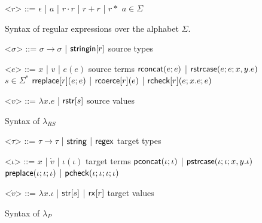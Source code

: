 \documentclass[11pt,leqno]{article}
\theoremstyle{definition}
\newcommand{\lambdap}{\lambda_P}
\newcommand{\sisubst}[3]{{\sf rreplace}[#1](#2;#3)} \newcommand{\rreplace}[3]{{\sf rreplace}[#1](#2;#3)} %
\newcommand{\rcoerce}[2]{{\sf rcoerce}[#1](#2)}
\newcommand{\sistr}[1]{{\sf rstr}[#1]}   \newcommand{\rstr}[1]{{\sf rstr}[#1]} %
\newcommand{\rcheck}[4]{ {\sf rcheck}[#1](#2;#3;#4) }
\newcommand{\strin}[1]{\sistr{#1}}
\newcommand{\rsconcat}[2]{{\sf rconcat}(#1;#2)} \newcommand{\rconcat}[2]{{\sf rconcat}(#1;#2)} %
\newcommand{\stringin}[1]{{\sf stringin}[#1]}
\newcommand{\tcheck}[4]{{\sf pcheck}(#1; #2; #3; #4)}
\renewcommand{\tstr}[1]{{{\sf str}[#1]}}
\newcommand{\preplace}[3]{{\sf preplace}(#1;#2;#3)}
\newcommand{\tconcat}[2]{{\sf pconcat}(#1;#2)} %
\newcommand{\rx}[1]{ {\sf rx}[#1] }
\newcommand{\str}{{\sf string}}
\newcommand{\regex}{{\sf regex}}
\newcommand{\strcase}[3]{ {\sf rstrcase}(#1; #2; #3)}
\newcommand{\pstrcase}[3]{ {\sf pstrcase}(#1; #2; #3)}
\begin{document}









\clearpage
\renewcommand{\grammarlabel}[2]{#1\hfill#2}
\begin{figure}[b]
\small
  \begin{grammar}
<$r$> ::= $\epsilon$ | $a$ | $r \cdot r$ | $r + r$ | $r*$ \hfill $a \in \Sigma$

\caption[Syntax of Regular Expressions]{Syntax of regular expressions over the alphabet $\Sigma$.}
\label{fig:regex}
\end{grammar}
\end{figure}
\begin{figure}[t]
\small
  \begin{grammar}
<$\sigma$> ::=  $\sigma \rightarrow \sigma$ | $\stringin{r}$    \hfill  source types

<$e$> ::= 
      $x$ | $v$ | $e(e)$ \hfill source terms \alt 
      $\rsconcat{e}{e}$ | $\strcase{e}{e}{x,y.e}$ \hfill $s \in \Sigma^{*}$ \alt
      $\sisubst{r}{e}{e}$ | $\rcoerce{r}{e}$ | $\rcheck{r}{e}{x.e}{e}$

<$v$> ::= $\lambda x . e$ | $\strin{s}$ \hfill source values 
\caption{Syntax of $\lambda_{RS}$}
\label{fig:glambdas}
\end{grammar}
\end{figure}


\renewcommand{\grammarlabel}[2]{#1\hfill#2}

\begin{figure}[t]
\small
  \begin{grammar}

<$\tau$> ::= $\tau \rightarrow \tau$ | $\str$ | $\regex$ \hfill target types

<$\iota$> ::= $x$ | $\dot{v}$ | $\iota(\iota)$ \hfill target terms \alt
$\tconcat{\iota}{\iota}$ | $\pstrcase{\iota}{\iota}{x,y.\iota}$ \alt
  $\preplace{\iota}{\iota}{\iota}$ | $\tcheck{\iota}{\iota}{\iota}{\iota}$ 

  <$\dot{v}$> ::= $\lambda x . \iota$ | $\tstr{s}$ | $\rx{r}$ \hfill target values

\end{grammar}
\caption{Syntax of $\lambdap$}
\label{fig:lcsSyntax}
\end{figure}
\end{document}
